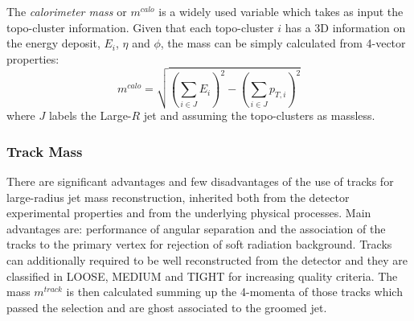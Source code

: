The \textit{calorimeter mass} or $m^{calo}$ is a widely used variable which takes as input the topo-cluster information. Given that each topo-cluster $i$ has a 3D information on the energy deposit, $E_i$, $\eta$ and $\phi$, the mass can be simply calculated from 4-vector properties:
$$m^{calo}=\sqrt{\left(\sum_{i\in J}E_i\right)^2-\left(\sum_{i\in J}p_{T,i}\right)^2} $$
where $J$ labels the Large-$R$ jet and assuming the topo-clusters as massless.

\subsubsection{Track Mass}
\label{sec:tracks}
There are significant advantages and few disadvantages of the use of tracks for large-radius jet mass reconstruction, inherited both from the detector experimental properties and from the underlying physical processes. 
Main advantages are: performance of angular separation and the association of the tracks to the primary vertex for rejection of soft radiation background.
Tracks can additionally required to be well reconstructed from the detector and they are classified in  \textrm{LOOSE},  \textrm{MEDIUM} and \textrm{TIGHT} for increasing quality criteria.
The mass $m^{track}$ is then calculated summing up the 4-momenta of those tracks which passed the selection and are ghost associated to the groomed jet.





